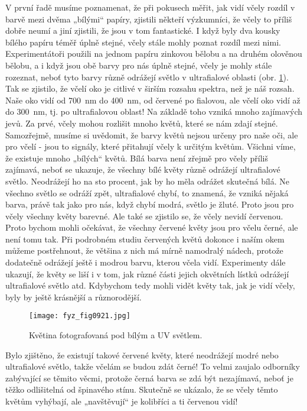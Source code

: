     V první řadě musíme poznamenat, že při pokusech měřit, jak vidí včely rozdíl v barvě mezi dvěma
    „bílými“ papíry, zjistili někteří výzkumníci, že včely to příliš dobře neumí a jiní zjistili, že
    jsou v tom fantastické. I když byly dva kousky bílého papíru téměř úplně stejné, včely stále
    mohly poznat rozdíl mezi nimi. Experimentátoři použili na jednom papíru zinkovou bělobu a na
    druhém olověnou bělobu, a i když jsou obě barvy pro nás úplně stejné, včely je mohly stále
    rozeznat, neboť tyto barvy různě odrážejí světlo v ultrafialové oblasti (obr. \ref{fyz:fig0921}).
    Tak se zjistilo, že včelí oko je citlivé v širším rozsahu spektra, než je náš rozsah. Naše oko
    vidí od \SI{700}{\nm} do \SI{400}{\nm}, od červené po fialovou, ale včelí oko vidí až do
    \SI{300}{\nm}, tj. po ultrafialovou oblast! Na základě toho vzniká mnoho zajímavých jevů. Za
    prvé, včely mohou rozlišit mnoho květů, které se nám zdají stejné. Samozřejmě, musíme si
    uvědomit, že barvy květů nejsou určeny pro naše oči, ale pro včelí - jsou to signály, které
    přitahují včely k určitým květům. Všichni víme, že existuje mnoho „bílých“ květů. Bílá barva
    není zřejmě pro včely příliš zajímavá, neboť se ukazuje, že všechny bílé květy různě odrážejí
    ultrafialové světlo. Neodrážejí ho na sto procent, jak by ho měla odrážet skutečná bílá. Ne
    všechno světlo se odráží zpět, ultrafialové chybí, to znamená, že vzniká nějaká barva, právě tak
    jako pro nás, když chybí modrá, světlo je žluté. Proto jsou pro včely všechny květy barevné. Ale
    také se zjistilo se, že včely nevidí červenou. Proto bychom mohli očekávat, že všechny červené
    květy jsou pro včelu černé, ale není tomu tak. Při podrobném studiu červených květů dokonce i
    naším okem můžeme postřehnout, že většina z nich má mírně namodralý nádech, protože dodatečně
    odrážejí ještě i modrou barvu, kterou včela vidí. Experimenty dále ukazují, že květy se liší i v
    tom, jak různé části jejich okvětních lístků odrážejí ultrafialové světlo atd. Kdybychom tedy
    mohli vidět květy tak, jak je vidí včely, byly by ještě krásnější a různorodější.

    \begin{figure}[ht!] %
      \centering
      \texttt{[image: fyz\_fig0921.jpg]}
      \caption{Květina fotografovaná pod bílým a UV světlem.}
      \label{fyz:fig0921}
    \end{figure}
    
    Bylo zjištěno, že existují takové červené květy, které neodrážejí modré nebo ultrafialové
    světlo, takže včelám se budou zdát černé! To velmi zaujalo odborníky zabývající se těmito věcmi,
    protože černá barva se zdá být nezajímavá, neboť je těžko odlišitelná od špinavého stínu.
    Skutečně se ukázalo, že se včely těmto květům vyhýbají, ale „navštěvují“ je kolibříci a ti
    červenou vidí!

